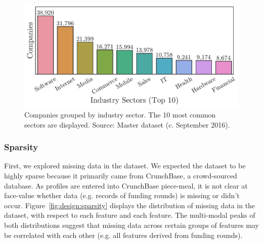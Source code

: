 \documentclass[../thesis/thesis.tex]{subfiles}
\begin{document}
\begin{figure}[!htb]
    \centering
    \includegraphics[width=\textwidth]{../figures/design/industry_counts}
    \caption[Companies by industry sector]{Companies grouped by industry sector. The 10 most common sectors are displayed. Source: Master dataset (c. September 2016).}
    \label{fig:design:industry_counts}
\end{figure}

\subsubsection{Sparsity}

First, we explored missing data in the dataset. We expected the dataset to be highly sparse because it primarily came from CrunchBase, a crowd-sourced database. As profiles are entered into CrunchBase piece-meal, it is not clear at face-value whether data (e.g. records of funding rounds) is missing or didn't occur. Figure~\ref{fig:design:sparsity} displays the distribution of missing data in the dataset, with respect to each feature and each feature. The multi-modal peaks of both distributions suggest that missing data across certain groups of features may be correlated with each other (e.g. all features derived from funding rounds).
\end{document}
